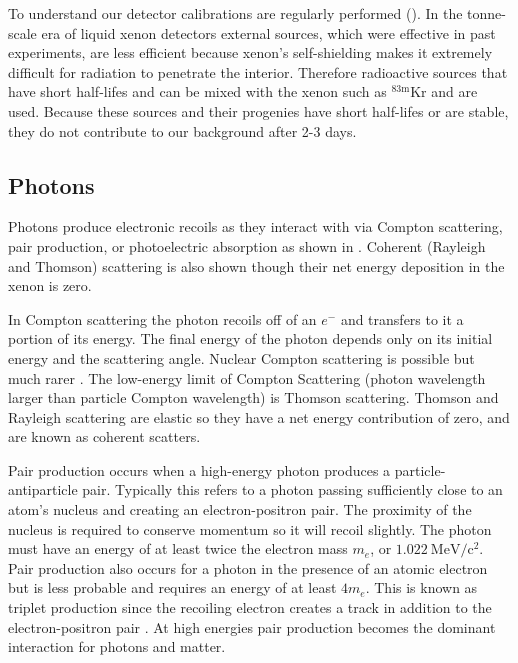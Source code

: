 To understand our detector calibrations are regularly performed ().  In the tonne-scale era of liquid xenon
detectors external sources, which were effective in past experiments, are less efficient because xenon's self-shielding makes it extremely
difficult for radiation to penetrate the interior.  Therefore radioactive
sources that have short half-lifes and can be mixed with the xenon such as $\mathrm{^{83m}Kr}$ and \radoncal are used.  Because these
sources and their progenies have short half-lifes or are stable, they do not contribute to our background after 2-3 days.

\subsection{Photons}
\label{subsec:photons}
Photons produce electronic recoils as they interact with \electron via Compton scattering, pair production, or photoelectric absorption
as shown in .  Coherent (Rayleigh and Thomson) scattering is also shown though their net energy deposition in the
xenon is zero.

In Compton scattering the photon recoils off of an $e^{-}$ and transfers to it a portion of its energy.  The final energy of the photon
depends only on its initial energy and the scattering angle.  Nuclear Compton scattering is possible but much rarer
.  The low-energy limit of Compton Scattering (photon wavelength larger than particle Compton wavelength) is
Thomson scattering.  Thomson and Rayleigh scattering are elastic so they have a net energy contribution of zero, and are known as coherent
scatters.

Pair production occurs when a high-energy photon produces a particle-antiparticle pair.  Typically this refers to a photon passing
sufficiently
close to an atom's nucleus and creating an electron-positron pair.  The proximity of the nucleus is required to conserve momentum so it
will recoil slightly.  The photon must have an energy of at least twice the electron mass $m_{e}$, or $1.022\ \mathrm{MeV/c^2}$.  Pair
production
also occurs for a photon in the presence of an atomic electron but is less probable and requires an energy of at least $4m_{e}$.  This
is known as triplet production since the recoiling electron creates a track in addition to the electron-positron pair
.  At high energies pair production becomes the dominant interaction for photons and matter.

